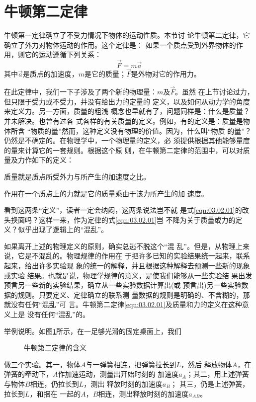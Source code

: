 \section{牛顿第二定律}\label{sec:03.02}

牛顿第一定律确立了不受力情况下物体的运动性质。本节讨
论牛顿第二定律，它确立了外力对物体运动的作用。这个定律是：
如果一个质点受到外界物体的作用，则它的运动遵循下列关系：
\begin{equation}\label{eqn:03.02.01}
  \vec{F} = m \vec{a}
\end{equation}
其中$\vec{a}$是质点的加速度，$m$是它的质量；$\vec{F}$是外物对它的作用力。

在此定律中，我们一下子涉及了两个新的物理量：$m$及$\vec{F}$。虽然
在上节讨论过力，但只限于受力或不受力，并没有给出力的定量的
定义，以及如何从动力学的角度来定义力。另一方面，质量的粗浅
概念也早就有了，问题同样是：什么是质量？并未解决。也曾有过各
式各样的有关质量的定义。例如，有的定义是：质量是物体所含
“物质的量”然而，这种定义没有物理的价值。因为，什么叫“物质
的量”？仍然是不确定的。在物理学中，一个物理量的定义，必
须提供根据其他能够量度的量来计算它的一套规则。根据这个原
则，在牛顿第二定律的范围中，可以对质量及力作如下的定义：

质量就是质点所受外力与所产生的加速度之比。

作用在一个质点上的力就是它的质量乘由于该力所产生的加
速度。

看到这两条“定义”，读者一定会纳闷，这两条说法岂不就
是式\eqref{eqn:03.02.01}的改头换面吗？这样一来，作为定律的式\eqref{eqn:03.02.01}岂
不降为关于质量或力的定义？似乎出现了逻辑上的“混乱”。

如果离开上述的物理定义的原则，确实总逃不脱这个“混
乱”。但是，从物理上来说，它是不混乱的。物理规律的作用在
于把许多已知的实验结果统一起来，联系起来，给出许多实验现
象的统一的解释，并且根据这种解释去预测一些新的现象或实验
结果。也就是说，物理学规律的意义，是使我们能够从一些实验结
果出发预言另一些新的实验结果，确立从一些实验数据计算出(或
预言出)另一些实验数据的规则。只要定义、定律确立的联系测
量数据的规则是明确的、不含糊的，那就没有任何“混乱”可
言。牛顿第二定律\lbr \eqref{eqn:03.02.01}\rbr 及质量和力的定义在这种意义上是
没有任何“混乱”的。

举例说明。如图\ref{fig:03.02}所示，在一足够光滑的固定桌面上，我们

\begin{figure}[!h]
  \centering
  \hfill
  \hfill
  \hfill
  \hfill
  \caption{牛顿第二定律的含义}
  \label{fig:03.02}
\end{figure}
\clearpage
\noindent 做三个实验。其一，物体$ A $与一弹簧相连，把弹簧拉长到$ L $，然后
释放物体$ A $，在弹簧的牵动下，$ A $作加速运动，测量出开始时刻的
加速度$ a_A $；其二，用上述弹簧与物体$ B $相连，仍拉长到$ L $，测出
释放时刻的加速度$ a _ { B } $； 其三，仍是上述弹簧，拉长到$ L $，和捆在
一起的$ A $，$ B $相连，测出释放时刻的加速度$ a _ { A B } $。

